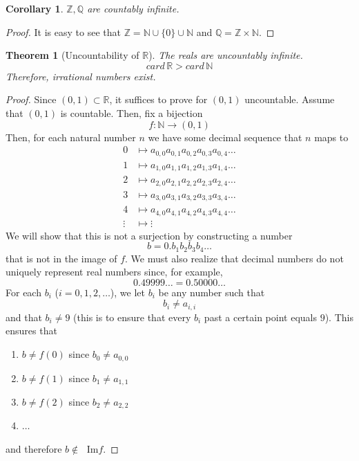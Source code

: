 \documentclass{article}
\newtheorem{theorem}{Theorem}[section]
\newtheorem{corollary}{Corollary}[theorem]
\theoremstyle{remark}
\theoremstyle{definition}
\begin{document}
\begin{corollary}
$\mathbb{Z}, \mathbb{Q}$ are countably infinite.
\end{corollary}
\begin{proof}
It is easy to see that $\mathbb{Z} = \mathbb{N} \cup \{0\} \cup \mathbb{N}$ and $\mathbb{Q} = \mathbb{Z} \times \mathbb{N}$. 
\end{proof}

\begin{theorem}[Uncountability of $\mathbb{R}$]
The reals are uncountably infinite. 
\[card\,\mathbb{R} > card \, \mathbb{N}\]
Therefore, irrational numbers exist. 
\end{theorem}
\begin{proof}
Since $(0, 1) \subset \mathbb{R}$, it suffices to prove for $(0, 1)$ uncountable. Assume that $(0, 1)$ is countable. Then, fix a bijection 
\[f: \mathbb{N} \longrightarrow (0, 1)\]
Then, for each natural number $n$ we have some decimal sequence that $n$ maps to
\begin{align*}
    0 & \mapsto a_{0,0} a_{0,1} a_{0,2} a_{0,3} a_{0,4} \ldots \\
    1 & \mapsto a_{1,0} a_{1,1} a_{1,2} a_{1,3} a_{1,4} \ldots \\
    2 & \mapsto a_{2,0} a_{2,1} a_{2,2} a_{2,3} a_{2,4} \ldots \\
    3 & \mapsto a_{3,0} a_{3,1} a_{3,2} a_{3,3} a_{3,4} \ldots \\
    4 & \mapsto a_{4,0} a_{4,1} a_{4,2} a_{4,3} a_{4,4} \ldots \\
    \vdots & \mapsto \vdots
\end{align*}
We will show that this is not a surjection by constructing a number 
\[b = 0. b_1 b_2 b_3 b_4 \ldots\]
that is not in the image of $f$. We must also realize that decimal numbers do not uniquely represent real numbers since, for example, 
\[0.49999\ldots = 0.50000\ldots\]
For each $b_i$ ($i = 0, 1, 2, \ldots$), we let $b_i$ be any number such that
\[b_i \neq a_{i,i}\]
and that $b_i \neq 9$ (this is to ensure that every $b_i$ past a certain point equals $9$). This ensures that 
\begin{enumerate}
    \item $b \neq f(0)$ since $b_0 \neq a_{0,0}$
    \item $b \neq f(1)$ since $b_1 \neq a_{1,1}$
    \item $b \neq f(2)$ since $b_2 \neq a_{2,2}$
    \item $\ldots$
\end{enumerate}
and therefore $b \not\in\;$ Im$f$. 
\end{proof}
\end{document}
